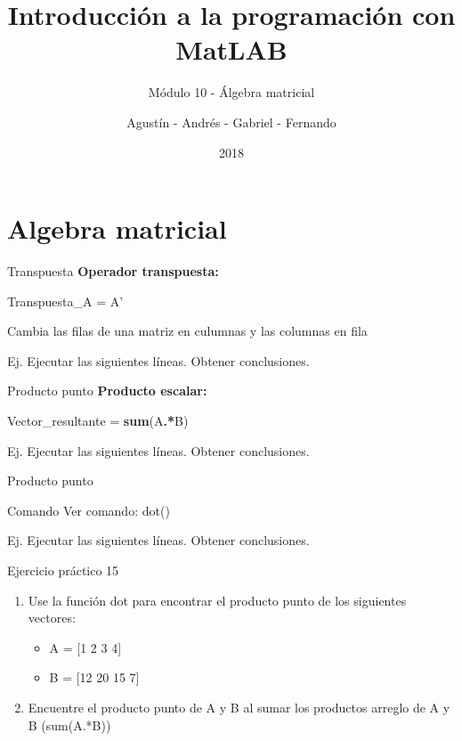 \documentclass{bredelebeamer}
\title[Programación en MatLAB]{Introducción a la programación con MatLAB}
\subtitle{Módulo 10 - Álgebra matricial}
\author{Agustín - Andrés - Gabriel - Fernando\inst{1}}
\institute[UTN.BA]
{
  \inst{1}%
  Universidad Tecnológica Nacional\\
  Facultad Regional Buenos Aires
  }
\date{2018}
\begin{document}
\begin{frame}
  \titlepage 
\end{frame}



\section{Algebra matricial}

\begin{frame}{Transpuesta}
\textbf{Operador transpuesta:} 
\begin{center}
Transpuesta\_A = A'
\end{center}
\begin{center}
Cambia las filas de una matriz en culumnas y las columnas en fila
\end{center}
Ej. Ejecutar las siguientes líneas. Obtener conclusiones.

\end{frame}

\begin{frame}{Producto punto}
\textbf{Producto escalar:}
\begin{center}
Vector\_resultante = \textbf{sum}(A\textbf{.*}B)
\end{center}
Ej. Ejecutar las siguientes líneas. Obtener conclusiones.

\end{frame}

\begin{frame}{Producto punto}
\begin{exampleblock}{Comando}
Ver comando: dot()
\end{exampleblock}
Ej. Ejecutar las siguientes líneas. Obtener conclusiones.

\end{frame}

\begin{frame}{Ejercicio práctico 15}
\begin{enumerate}
\item Use la función dot para encontrar el producto punto de los siguientes vectores:
\begin{itemize}
\item A = [1 2 3 4]
\item B = [12 20 15 7]
\end{itemize}
\item Encuentre el producto punto de A y B al sumar los productos arreglo de A y B (sum(A.*B))
\end{enumerate}
\end{frame}
\end{document}
